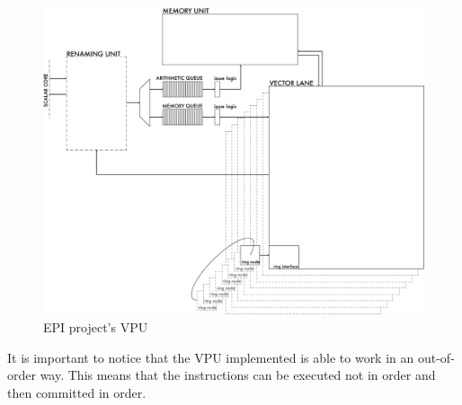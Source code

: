 \begin{figure}[H]
    \centering
    \includegraphics[scale = 0.5]{Chapter_1/img/VPU.png}
    \caption{EPI project's VPU}
    \label{VPU}
\end{figure}
It is important to notice that the VPU implemented is able to work in an out-of-order way. This means that the instructions can be executed not in order and then committed in order.\\



